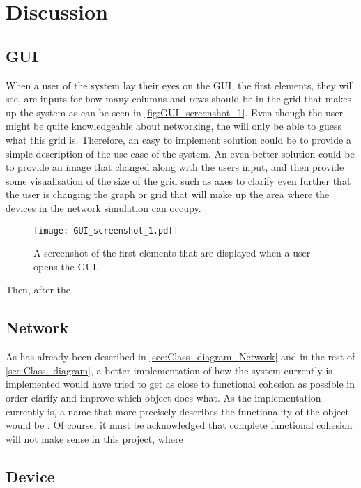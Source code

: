 \chapter{Discussion}\label{ch:Discussion}


\section{GUI}
When a user of the system lay their eyes on the GUI, the first elements, they will see, are inputs for how many columns and rows should be in the grid that makes up the system as can be seen in \autoref{fig:GUI_screenshot_1}. Even though the user might be quite knowledgeable about networking, the will only be able to guess what this grid is. Therefore, an easy to implement solution could be to provide a simple description of the use case of the system. An even better solution could be to provide an image that changed along with the users input, and then provide some visualisation of the size of the grid such as axes to clarify even further that the user is changing the graph or grid that will make up the area where the devices in the network simulation can occupy.

\begin{figure}[H]
  \centering
  \texttt{[image: GUI\_screenshot\_1.pdf]}
  \caption{A screenshot of the first elements that are displayed when a user opens the GUI.}
  \label{fig:GUI_screenshot_1}
\end{figure}

Then, after the 


\section{Network}
As has already been described in \autoref{sec:Class_diagram_Network} and in the rest of \autoref{sec:Class_diagram}, a better implementation of how the system currently is implemented would have tried to get as close to functional cohesion as possible in order clarify and improve which object does what. As the implementation currently is, a name that more precisely describes the functionality of the  object would be . Of course, it must be acknowledged that complete functional cohesion will not make sense in this project, where 


\section{Device}


